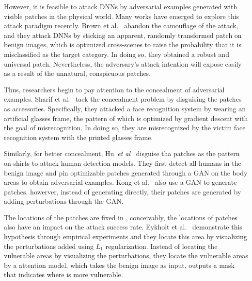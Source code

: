 \documentclass[10pt,twocolumn,letterpaper]{article}
\begin{document}
However, it is feasible to attack DNNs by adversarial 
examples generated with visible patches in the physical world.
Many works have emerged to explore this attack paradigm recently. 
Brown et al.~\cite{Brown_2017_arxiv} 
abandon the camouflage of the attack, 
and they attack DNNs by sticking an apparent, randomly transformed 
patch on benign images, which is optimized cross-scenes to raise the 
probability that it is misclassified as the target category.
In doing so, they obtained a robust and universal patch.
Nevertheless, the adversary's attack intention will expose 
easily as a result of 
the unnatural, conspicuous patches. 

Thus, researchers begin to 
pay attention to the concealment of adversarial examples.
Sharif et al.~\cite{Sharif_2017_CCS} tack the concealment 
problem by disguising the patches as accessories. 
Specifically, they attacked a face recognition 
system by wearing an artificial glasses frame,
the pattern of which is optimized by gradient 
descent with the goal of misrecognition. 
In doing so, they are misrecognized by the victim face recognition
system with the printed glasses frame.

Similarly, for better concealment, 
Hu~\textit{et al}~\cite{Hu_2021_ICCV} disguise tha patches as
the pattern on shirts to attack human detection models. 
They first detect all humans in the benign image and pin   
optimizable patches generated through a GAN on the body areas 
to obtain adversarial
examples. 
Kong et al.~\cite{Kong_2020_CVPR} also use a GAN to generate 
patches.
howerver, instead of generating directly, their patches are 
generated by adding perturbations through the GAN.

The locations of the patches are fixed in 
\cite{Sharif_2017_CCS, Hu_2021_ICCV,Kong_2020_CVPR}, 
conceivably, the locations of patches also have an impact 
on the attack success rate. 
Eykholt et al.~\cite{Eykholt_2018_CVPR} demonstrate this 
hypothesis through empirical experiments and they locate this 
area by visualizing the perturbations added using 
$L_1$ regularization. 
Instead of locating the vulnerable areas by visualizing 
the perturbations, 
they locate the vulnerable areas by a attention model, 
which takes the 
benign image as input, outputs a mask that indicates where 
is more vulnerable. 
\end{document}
